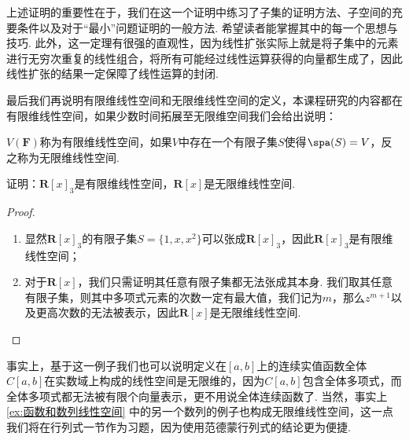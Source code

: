 上述证明的重要性在于，我们在这一个证明中练习了子集的证明方法、子空间的充要条件以及对于``最小''问题证明的一般方法. 希望读者能掌握其中的每一个思想与技巧. 此外，这一定理有很强的直观性，因为线性扩张实际上就是将子集中的元素进行无穷次重复的线性组合，将所有可能经过线性运算获得的向量都生成了，因此线性扩张的结果一定保障了线性运算的封闭.

最后我们再说明有限维线性空间和无限维线性空间的定义，本课程研究的内容都在有限维线性空间，如果少数时间拓展至无限维空间我们会给出说明：
\begin{definition}{}{}
    $V(\mathbf{F})$称为有限维线性空间，如果$V$中存在一个有限子集$S$使得$\spa(S)=V$，反之称为无限维线性空间.
\end{definition}

\begin{example}{}{}
    证明：$\mathbf{R}[x]_3$是有限维线性空间，$\mathbf{R}[x]$是无限维线性空间.
\end{example}

\begin{proof}
    \begin{enumerate}
        \item 显然$\mathbf{R}[x]_3$的有限子集$S=\{1,x,x^2\}$可以张成$\mathbf{R}[x]_3$，因此$\mathbf{R}[x]_3$是有限维线性空间；

        \item 对于$\mathbf{R}[x]$，我们只需证明其任意有限子集都无法张成其本身. 我们取其任意有限子集，则其中多项式元素的次数一定有最大值，我们记为$m$，那么$z^{m+1}$以及更高次数的无法被表示，因此$\mathbf{R}[x]$是无限维线性空间.
    \end{enumerate}
\end{proof}

事实上，基于这一例子我们也可以说明定义在$[a,b]$上的连续实值函数全体$C[a,b]$在实数域上构成的线性空间是无限维的，因为$C[a,b]$包含全体多项式，而全体多项式都无法被有限个向量表示，更不用说全体连续函数了. 当然，事实上\autoref{ex:函数和数列线性空间} 中的另一个数列的例子也构成无限维线性空间，这一点我们将在行列式一节作为习题，因为使用范德蒙行列式的结论更为便捷.

